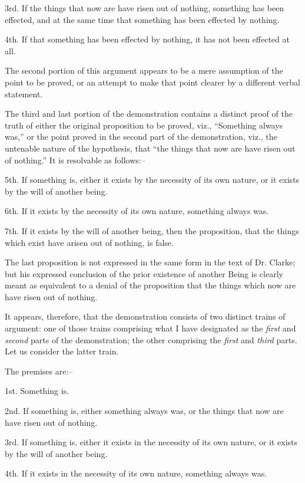 \documentclass[oneside]{book}
\begin{document}
3rd. If the things that now are have risen out of nothing,
something has been effected, and at the same time that something
has been effected by nothing.

4th. If that something has been effected by nothing, it has
not been effected at all.

The second portion of this argument appears to be a mere
assumption of the point to be proved, or an attempt to make that
point clearer by a different verbal statement.

The third and last portion of the demonstration contains a distinct
proof of the truth of either the original proposition to be
proved, viz., ``Something always was,'' or the point proved in
the second part of the demonstration, viz., the untenable nature
of the hypothesis, that ``the things that now are have risen out
of nothing.'' It is resolvable as follows:--

5th. If something is, either it exists by the necessity of its
own nature, or it exists by the will of another being.

6th. If it exists by the necessity of its own nature, something
always was.

7th. If it exists by the will of another being, then the proposition,
that the things which exist have arisen out of nothing,
is false.

The last proposition is not expressed in the same form in the
text of Dr. Clarke; but his expressed conclusion of the prior existence
of another Being is clearly meant as equivalent to a denial
of the proposition that the things which now are have risen
out of nothing.

It appears, therefore, that the demonstration consists of two
distinct trains of argument: one of those trains comprising what
I have designated as the \textit{first} and \textit{second} parts of the demonstration;
the other comprising the \textit{first} and \textit{third} parts. Let us consider
the latter train.

The premises are:--

1st. Something is.

2nd. If something is, either something always was, or the
things that now are have risen out of nothing.

3rd. If something is, either it exists in the necessity of its
own nature, or it exists by the will of another being.

4th. If it exists in the necessity of its own nature, something
always was.
\end{document}
